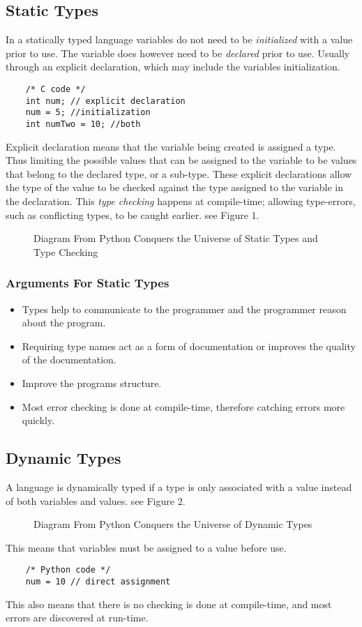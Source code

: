 \documentclass{sig-alternate}
\begin{document}
\subsection{Static Types}\label{static}
In a statically typed language variables do not need to be \emph{initialized} with a value prior to use. The variable does however need to be \emph{declared} prior to use. Usually through an explicit declaration, which may include the variables initialization.  
\begin{lstlisting}
	/* C code */
	int num; // explicit declaration
	num = 5; //initialization
	int numTwo = 10; //both
\end{lstlisting}
Explicit declaration means that the variable being created is assigned a type. Thus limiting the possible values that can be assigned to the variable to be values that belong to the declared type, or a sub-type. These explicit declarations allow the type of the value to be checked against the type assigned to the variable in the declaration. This \emph{type checking} happens at compile-time; allowing type-errors, such as conflicting types, to be caught earlier. see Figure 1.  
\begin{figure}
\centering
{}
\caption{Diagram From Python Conquers the Universe of Static Types and Type Checking}
\end{figure}
\subsubsection{Arguments For Static Types}
\begin{itemize}
\item Types help to communicate to the programmer and the programmer reason about the program.
\item Requiring type names act as a form of documentation or improves the quality of the documentation.
\item Improve the programs structure.
\item Most error checking is done at compile-time, therefore catching errors more quickly.
\end{itemize}

\subsection{Dynamic Types} \label{dynamic}

A language is dynamically typed if a type is only associated with a value instead of both variables and values. see Figure 2. \begin{figure}
\centering
{}
\caption{Diagram From Python Conquers the Universe of Dynamic Types}
\end{figure}
This means that variables must be assigned to a value before use. 
\begin{lstlisting}
	/* Python code */
	num = 10 // direct assignment
\end{lstlisting}
This also means that there is no checking is done at compile-time, and most errors are discovered at run-time.
\end{document}
